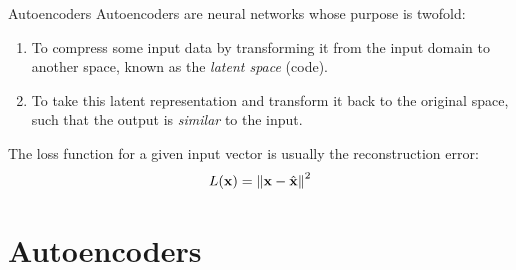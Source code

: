 \documentclass[xcolor=pdftex,dvipsnames,table,mathserif]{beamer}
\begin{document}
\begin{frame}{Autoencoders}
Autoencoders are neural networks whose purpose is twofold:
\begin{enumerate}
\item To compress some input data by transforming it from the input domain to another space,
known as the \emph{latent space} (code).
\item To take this latent representation and transform it back to the original space, such that the output is \emph{similar} to the input.
\end{enumerate}

\begin{figure}
\centering
{}
\end{figure}

The loss function for a given input vector is usually the reconstruction error:
\[
L(\mathbf{x}) = \norm{ \mathbf{x}-\hat{\mathbf{x}}}^2
\]


\end{frame}


\section{Autoencoders}
\end{document}

